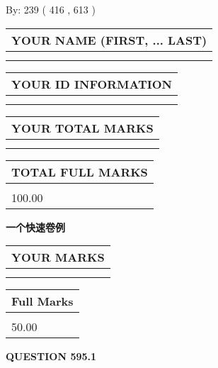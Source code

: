 \documentclass{ctexart}
\begin{document}
   
\hspace{1.0in} By: 
 239 ( 416 ,  613 )
   
   
   
   
\newpage 
\setcounter{page}{ 
   595001 } 
   
   
   
   
\noindent\begin{tabular}{|l|}
\hline
YOUR NAME (FIRST, ... LAST)  \\
\hline
 \\ 
 \\ 
\hline
\end{tabular}
\hspace{0.05in} \begin{tabular}{|l|}
\hline
 YOUR   ID   INFORMATION  \\
\hline
 \\ 
 \\ 
\hline
\end{tabular}
   
   
\vspace{0.2in}\noindent\begin{tabular}{|l|}
\hline
YOUR TOTAL MARKS  \\
\hline
 \\ 
 \\ 
\hline
\end{tabular}
\hspace{0.05in} \begin{tabular}{|l|}
\hline
TOTAL FULL MARKS  \\
\hline
 \\ 
100.00 \\
\hline
\end{tabular}
   
   
 \vspace{0.2in}
{\LARGE {\textbf{ 一个快速卷例}}}
   
   
  
\vspace{0.2in}
  
\noindent\begin{tabular}{|l|}
\hline
 YOUR MARKS  \\
\hline
 \\ 
 \\ 
\hline
\end{tabular}
\hspace{0.05in} \begin{tabular}{|l|}
\hline
 Full Marks  \\
\hline
 \\ 
50.00 \\
\hline
\end{tabular}
{\textbf{\Large{QUESTION
595.1 
}}}
  
\end{document}
